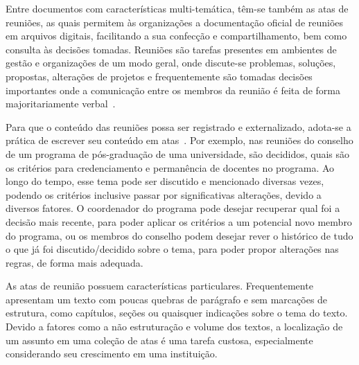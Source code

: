 Entre documentos com características multi-temática, têm-se também as atas de reuniões, as quais permitem às organizações a documentação oficial de reuniões em arquivos digitais, facilitando a sua confecção e compartilhamento, bem como consulta às decisões tomadas.
% 
% 
% 
Reuniões são tarefas presentes em ambientes de gestão e organizações de um modo geral, onde discute-se problemas, soluções, propostas, alterações de projetos e frequentemente são tomadas decisões importantes onde a comunicação entre os membros da reunião é feita de forma majoritariamente verbal~\cite{Bokaei2016, Miriam2013}. 

Para que o conteúdo das reuniões possa ser registrado e externalizado, adota-se a prática de escrever seu conteúdo em atas~\cite{Miriam2013, Lee2011}. Por exemplo, nas reuniões do conselho de um programa de pós-graduação de uma universidade, são decididos, quais são os critérios para credenciamento e permanência de docentes no programa. Ao longo do tempo, esse tema pode ser discutido e mencionado diversas vezes, podendo os critérios inclusive passar por significativas alterações, devido a diversos fatores. O coordenador do programa pode desejar recuperar qual foi a decisão mais recente, para poder aplicar os critérios a um potencial novo membro do programa, ou os membros do conselho podem desejar rever o histórico de tudo o que já foi discutido/decidido sobre o tema, para poder propor alterações nas regras, de forma mais adequada.

As atas de reunião possuem características particulares. Frequentemente apresentam um texto com poucas quebras de parágrafo e sem marcações de estrutura, como capítulos, seções ou quaisquer indicações sobre o tema do texto. Devido a fatores como a não estruturação e volume dos textos, a localização de um assunto em uma coleção de atas é uma tarefa custosa, especialmente considerando seu crescimento em uma instituição. 


